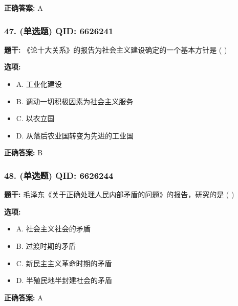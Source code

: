 \documentclass[12pt,UTF8]{ctexart}
\begin{document}
\textbf{正确答案:}
A

\vspace{0.3em}\hrulefill\vspace{0.7em}

\subsubsection*{47. (单选题) \small QID: 6626241}

\textbf{题干:}
《论十大关系》的报告为社会主义建设确定的一个基本方针是  ( )

\textbf{选项:}
\begin{itemize}[leftmargin=*]

  \item A. 工业化建设

  \item B. 调动一切积极因素为社会主义服务

  \item C. 以农立国

  \item D. 从落后农业国转变为先进的工业国

\end{itemize}

\textbf{正确答案:}
B

\vspace{0.3em}\hrulefill\vspace{0.7em}

\subsubsection*{48. (单选题) \small QID: 6626244}

\textbf{题干:}
毛泽东《关于正确处理人民内部矛盾的问题》的报告，研究的是  ( )

\textbf{选项:}
\begin{itemize}[leftmargin=*]

  \item A. 社会主义社会的矛盾

  \item B. 过渡时期的矛盾

  \item C. 新民主主义革命时期的矛盾

  \item D. 半殖民地半封建社会的矛盾

\end{itemize}

\textbf{正确答案:}
A

\vspace{0.3em}\hrulefill\vspace{0.7em}
\end{document}
